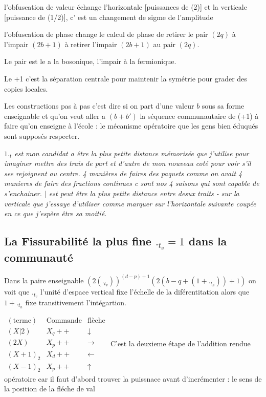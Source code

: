 \documentclass{article}
\begin{document}
l'obfuscation de valeur échange l'horizontale [puissances de (2)] et la verticale [puissance de (1/2)], c' est un changement de sigme de l'amplitude

l'obfuscation de phase change le calcul de phase de retirer le pair  $(2q)$ à l'impair $(2b+1)$ à retirer l'impair $(2b+1)$ au pair $(2q)$.

Le pair est le a la bosonique, l'impair à la fermionique. 

Le +1 c'est la séparation centrale pour maintenir la symétrie pour grader des copies locales.

Les constructions pas à pas c'est dire si on part d'une valeur $b$ sous sa forme enseignable et qu'on veut aller a $(b+b')$ la séquence 
communautaire de  (+1)  à faire qu'on enseigne à l'école : le mécanisme opératoire que les gens bien éduqués sont supposés respecter.

 \emph{
 $1._t$ est mon candidat a être la plus petite distance mémorisée que j'utilise pour imaginer mettre des trais de part et d'autre de mon nouveau coté pour voir s'il see rejoignent au centre.  4 manières de faires des paquets comme on avait 4 manieres de faire des fractions continues c sont nos 4 saisons qui sont capable de s'enchainer. $|$ est peut être  la plus petite distance entre desux traits - sur la verticale que j'essaye d'utiliser comme marquer sur l'horizontale suivante coupée en ce que j'espère être sa moitié.} 
 
 \subsection{La Fissurabilité la plus fine $._{t_v}=1$ dans la communauté}

Dans la paire  enseignable $(2(._{t_v}))^{(d-p)+1}(2(b-q+(1+._{t_h}))+1)$ on voit que $._{t_v}$ l'unité d'espace vertical fixe l'échelle de la diférentitation alors que  $1+._{t_h}$ fixe transitivement l'intégartion. 

 
$ \begin{matrix}
 (\text{terme})& \text{Commande} & \text{flèche}\\
( X|2)&X_q++&\downarrow\\
 (2X)&X_p++&\rightarrow\\
(X+1)_2&X_d++&\leftarrow\\
(X-1)_2&X_p++&\uparrow
\end{matrix}$
C'est la deuxieme étape de l'addition rendue opératoire car il faut d'abord trouver la puissnace avant d'incrémenter : le sens de la position de la fléche de val
\end{document}
